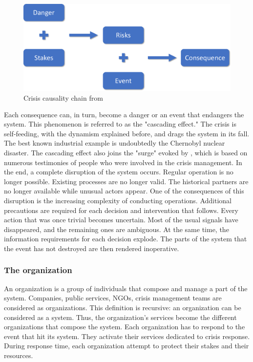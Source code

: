 \begin{figure}[htb]
    \centering
    \includegraphics[width=\textwidth]{figures/chap-1/fred-consequences-framework.pdf}
    \caption{Crisis causality chain from \textcite{benabenCollaborativeSystemsCrisis2014}}
    \label{context:fred-framework}
\end{figure}
\label{sec:danger-risk-consequence}

Each consequence can, in turn, become a danger or an event that endangers the system.
This phenomenon is referred to as the "cascading effect."
The crisis is self-feeding, with the dynamism explained before, and drags the system in its fall.
The best known industrial example is undoubtedly the Chernobyl nuclear disaster.
The cascading effect also joins the "surge" evoked by \textcite{lagadecGESTIONCRISES1994}, which is based on numerous testimonies of people who were involved in the crisis management.
In the end, a complete disruption of the system occurs.
Regular operation is no longer possible.
Existing processes are no longer valid.
The historical partners are no longer available while unusual actors appear.
One of the consequences of this disruption is the increasing complexity of conducting operations.
Additional precautions are required for each decision and intervention that follows.
Every action that was once trivial becomes uncertain.
Most of the usual signals have disappeared, and the remaining ones are ambiguous.
At the same time, the information requirements for each decision explode.
The parts of the system that the event has not destroyed are then rendered inoperative.

\subsubsection{The organization}
An organization is a group of individuals that compose and manage a part of the system.
Companies, public services, NGOs, crisis management teams are considered as organizations.
This definition is recursive: an organization can be considered as a system.
Thus, the organization's services become the different organizations that compose the system.
Each organization has to respond to the event that hit its system.
They activate their services dedicated to crisis response.
During response time, each organization attempt to protect their stakes and their resources.

